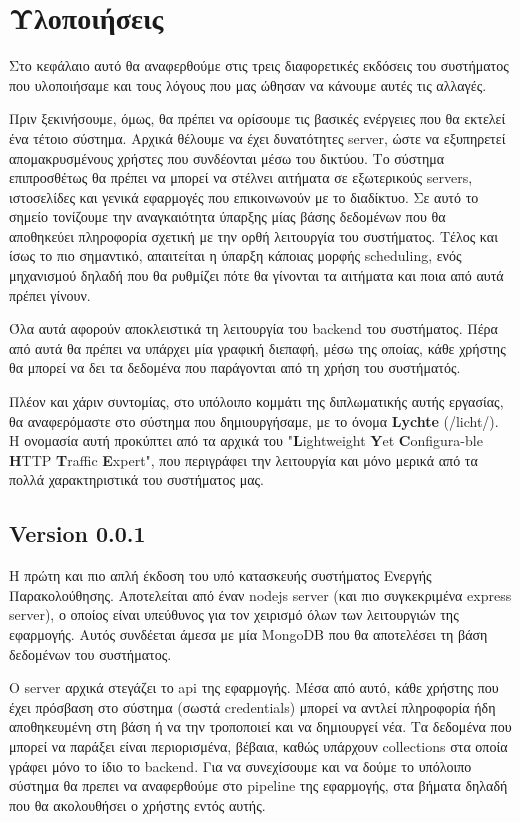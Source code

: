 \chapter{Υλοποιήσεις}
\label{chapter:implementations}

Στο κεφάλαιο αυτό θα αναφερθούμε στις τρεις διαφορετικές εκδόσεις του συστήματος που
υλοποιήσαμε και τους λόγους που μας ώθησαν να κάνουμε αυτές τις αλλαγές.

Πριν ξεκινήσουμε, όμως, θα πρέπει να ορίσουμε τις βασικές ενέργειες που θα εκτελεί ένα τέτοιο σύστημα.
Αρχικά θέλουμε να έχει δυνατότητες server, ώστε να εξυπηρετεί απομακρυσμένους χρήστες που συνδέονται μέσω του δικτύου.
Το σύστημα επιπροσθέτως θα πρέπει να μπορεί να στέλνει αιτήματα σε εξωτερικούς servers, ιστοσελίδες και γενικά
εφαρμογές που επικοινωνούν με το διαδίκτυο. Σε αυτό το σημείο τονίζουμε την αναγκαιότητα ύπαρξης μίας βάσης δεδομένων που θα αποθηκεύει
πληροφορία σχετική με την ορθή λειτουργία του συστήματος. Τέλος και ίσως το πιο σημαντικό, απαιτείται η ύπαρξη κάποιας
μορφής scheduling, ενός μηχανισμού δηλαδή που θα ρυθμίζει πότε θα γίνονται τα αιτήματα και ποια από αυτά πρέπει γίνουν.

Όλα αυτά αφορούν αποκλειστικά τη λειτουργία του backend του συστήματος. Πέρα από αυτά
θα πρέπει να υπάρχει μία γραφική διεπαφή, μέσω της οποίας, κάθε χρήστης θα μπορεί να δει τα δεδομένα που παράγονται
από τη χρήση του συστήματός.

Πλέον και χάριν συντομίας, στο υπόλοιπο κομμάτι της διπλωματικής αυτής εργασίας, θα αναφερόμαστε
στο σύστημα που δημιουργήσαμε, με το όνομα \textbf{Lychte} (/licht/). Η ονομασία αυτή προκύπτει από τα αρχικά του "\textbf{L}ightweight
\textbf{Y}et \textbf{C}onfigura\hyp{}ble \textbf{H}ΤTP \textbf{T}raffic \textbf{E}xpert", που περιγράφει την λειτουργία και μόνο
μερικά από τα πολλά χαρακτηριστικά του συστήματος μας.

\section{Version 0.0.1}
\label{section:first_implementation}

Η πρώτη και πιο απλή έκδοση του υπό κατασκευής συστήματος Ενεργής Παρακολούθησης. Αποτελείται από έναν
nodejs server (και πιο συγκεκριμένα express server), ο οποίος είναι υπεύθυνος για τον χειρισμό όλων των λειτουργιών της εφαρμογής. Αυτός συνδέεται
άμεσα με μία MongoDB που θα αποτελέσει τη βάση δεδομένων του συστήματος.

Ο server αρχικά στεγάζει το api της εφαρμογής. Μέσα από αυτό, κάθε χρήστης που έχει πρόσβαση στο σύστημα (σωστά credentials)
μπορεί να αντλεί πληροφορία ήδη αποθηκευμένη στη βάση ή να την τροποποιεί και να δημιουργεί νέα. Τα δεδομένα που μπορεί να παράξει
είναι περιορισμένα, βέβαια, καθώς υπάρχουν collections στα οποία γράφει μόνο το ίδιο το backend. Για να συνεχίσουμε και να δούμε το υπόλοιπο σύστημα
θα πρεπει να αναφερθούμε στο pipeline της εφαρμογής, στα βήματα δηλαδή που θα ακολουθήσει ο χρήστης εντός αυτής.

